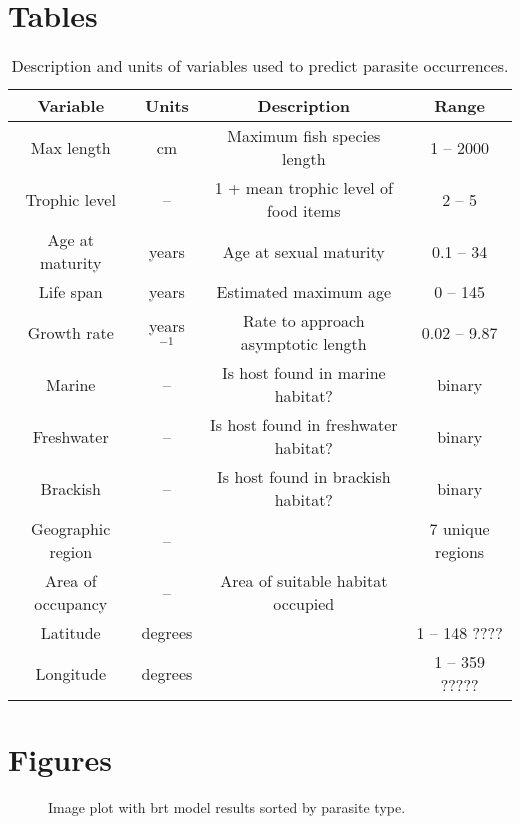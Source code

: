\documentclass[12pt]{article}
\begin{document}




\newpage
\section*{Tables}
  \begin{table}[!h]
  \caption{Description and units of variables used to predict parasite occurrences.}
  \begin{tabular}{cccc}
\hline
  \textbf{Variable} &   \textbf{Units} &   \textbf{Description} &   \textbf{Range} \\ 
\hline
Max length      & cm           & Maximum fish species length  & 1 -- 2000 \\ 
Trophic level   & --           & 1 + mean trophic level of food items   &  2 -- 5\\ 
Age at maturity & years        & Age at sexual maturity  & 0.1 -- 34  \\ 
Life span       & years        & Estimated maximum age & 0 -- 145  \\ 
Growth rate     & years$^{-1}$ & Rate to approach asymptotic length & 0.02 -- 9.87 \\ 
Marine          & --           & Is host found in marine habitat? & binary  \\ 
Freshwater      & --           & Is host found in freshwater habitat? & binary \\ 
Brackish        & --           & Is host found in brackish habitat? & binary \\ 
\hline 
Geographic region   & --      &           & 7 unique regions \\ 
Area of occupancy   & -- & Area of suitable habitat occupied &  \\
Latitude            & degrees &         & 1 -- 148 ???? \\ 
Longitude           & degrees &         & 1 -- 359 ????? \\ 
\hline
  \end{tabular}
  \label{tab:traits}
\end{table}


   
   
   

\newpage
\section{Figures}

\begin{figure}[h!]
  \caption{Image plot with brt model results sorted by parasite type.  }
 \label{fig:a}
 \end{figure}
\end{document}
